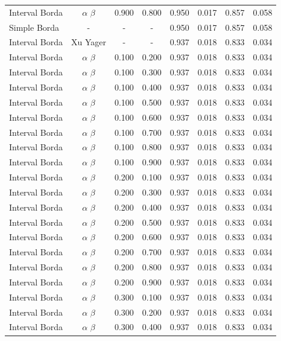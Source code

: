 \begin{longtable}{lccccccc}
Interval Borda & $\alpha$ $\beta$ & 0.900 & 0.800 & 0.950 & 0.017 & 0.857 & 0.058 \\
Simple Borda & - & - & - & 0.950 & 0.017 & 0.857 & 0.058 \\
Interval Borda & Xu Yager & - & - & 0.937 & 0.018 & 0.833 & 0.034 \\
Interval Borda & $\alpha$ $\beta$ & 0.100 & 0.200 & 0.937 & 0.018 & 0.833 & 0.034 \\
Interval Borda & $\alpha$ $\beta$ & 0.100 & 0.300 & 0.937 & 0.018 & 0.833 & 0.034 \\
Interval Borda & $\alpha$ $\beta$ & 0.100 & 0.400 & 0.937 & 0.018 & 0.833 & 0.034 \\
Interval Borda & $\alpha$ $\beta$ & 0.100 & 0.500 & 0.937 & 0.018 & 0.833 & 0.034 \\
Interval Borda & $\alpha$ $\beta$ & 0.100 & 0.600 & 0.937 & 0.018 & 0.833 & 0.034 \\
Interval Borda & $\alpha$ $\beta$ & 0.100 & 0.700 & 0.937 & 0.018 & 0.833 & 0.034 \\
Interval Borda & $\alpha$ $\beta$ & 0.100 & 0.800 & 0.937 & 0.018 & 0.833 & 0.034 \\
Interval Borda & $\alpha$ $\beta$ & 0.100 & 0.900 & 0.937 & 0.018 & 0.833 & 0.034 \\
Interval Borda & $\alpha$ $\beta$ & 0.200 & 0.100 & 0.937 & 0.018 & 0.833 & 0.034 \\
Interval Borda & $\alpha$ $\beta$ & 0.200 & 0.300 & 0.937 & 0.018 & 0.833 & 0.034 \\
Interval Borda & $\alpha$ $\beta$ & 0.200 & 0.400 & 0.937 & 0.018 & 0.833 & 0.034 \\
Interval Borda & $\alpha$ $\beta$ & 0.200 & 0.500 & 0.937 & 0.018 & 0.833 & 0.034 \\
Interval Borda & $\alpha$ $\beta$ & 0.200 & 0.600 & 0.937 & 0.018 & 0.833 & 0.034 \\
Interval Borda & $\alpha$ $\beta$ & 0.200 & 0.700 & 0.937 & 0.018 & 0.833 & 0.034 \\
Interval Borda & $\alpha$ $\beta$ & 0.200 & 0.800 & 0.937 & 0.018 & 0.833 & 0.034 \\
Interval Borda & $\alpha$ $\beta$ & 0.200 & 0.900 & 0.937 & 0.018 & 0.833 & 0.034 \\
Interval Borda & $\alpha$ $\beta$ & 0.300 & 0.100 & 0.937 & 0.018 & 0.833 & 0.034 \\
Interval Borda & $\alpha$ $\beta$ & 0.300 & 0.200 & 0.937 & 0.018 & 0.833 & 0.034 \\
Interval Borda & $\alpha$ $\beta$ & 0.300 & 0.400 & 0.937 & 0.018 & 0.833 & 0.034 \\

\end{longtable}
